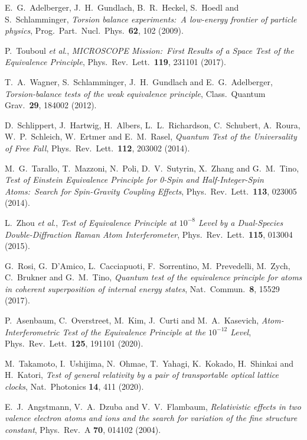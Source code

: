 \documentclass[aps,prd,onecolumn,nofootinbib]{revtex4-2} %
\begin{document}
\begin{thebibliography}{99}
 E.~G.~Adelberger, J.~H.~Gundlach, B.~R.~Heckel, S.~Hoedl and S.~Schlamminger, \textit{Torsion balance experiments:~A low-energy frontier of particle physics}, Prog.~Part.~Nucl.~Phys.~\textbf{62}, 102 (2009). 

 P.~Touboul \textit{et al}., \textit{MICROSCOPE Mission:~First Results of a Space Test of the Equivalence Principle}, Phys.~Rev.~Lett.~\textbf{119}, 231101 (2017). 

 T.~A.~Wagner, S.~Schlamminger, J.~H.~Gundlach and E.~G.~Adelberger, \textit{Torsion-balance tests of the weak equivalence principle}, Class.~Quantum Grav.~\textbf{29}, 184002 (2012). 


 D.~Schlippert, J.~Hartwig, H.~Albers, L.~L.~Richardson, C.~Schubert, A.~Roura, W.~P.~Schleich, W.~Ertmer and E.~M.~Rasel, \textit{Quantum Test of the Universality of Free Fall}, Phys.~Rev.~Lett.~\textbf{112}, 203002 (2014). 

 M.~G.~Tarallo, T.~Mazzoni, N.~Poli, D.~V.~Sutyrin, X.~Zhang and G.~M.~Tino, \textit{Test of Einstein Equivalence Principle for 0-Spin and Half-Integer-Spin Atoms:~Search for Spin-Gravity Coupling Effects}, Phys.~Rev.~Lett.~\textbf{113}, 023005 (2014). 

 L.~Zhou \textit{et al}., \textit{Test of Equivalence Principle at $10^{-8}$ Level by a Dual-Species Double-Diffraction Raman Atom Interferometer}, Phys.~Rev.~Lett.~\textbf{115}, 013004 (2015). 

 G.~Rosi, G.~D'Amico, L.~Cacciapuoti, F.~Sorrentino, M.~Prevedelli, M.~Zych, C.~Brukner and G.~M.~Tino, \textit{Quantum test of the equivalence principle for atoms in coherent superposition of internal energy states}, Nat.~Commun.~\textbf{8}, 15529 (2017). 

 P.~Asenbaum, C.~Overstreet, M.~Kim, J.~Curti and M.~A.~Kasevich, \textit{Atom-Interferometric Test of the Equivalence Principle at the $10^{-12}$ Level}, Phys.~Rev.~Lett.~\textbf{125}, 191101 (2020). 


 M.~Takamoto, I.~Ushijima, N.~Ohmae, T.~Yahagi, K.~Kokado, H.~Shinkai and H.~Katori, \textit{Test of general relativity by a pair of transportable optical lattice clocks}, Nat.~Photonics \textbf{14}, 411 (2020). 


 E.~J.~Angstmann, V.~A.~Dzuba and V.~V.~Flambaum, \textit{Relativistic effects in two valence electron atoms and ions and the search for variation of the fine structure constant}, Phys.~Rev.~A \textbf{70}, 014102 (2004). 


\end{thebibliography}
\end{document}
